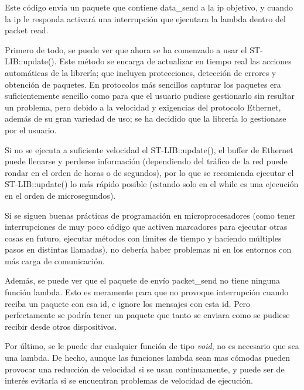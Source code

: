 \documentclass{report}
\begin{document}
Este código envía un paquete que contiene data\_send a la ip objetivo, y cuando la ip le responda activará una interrupción que ejecutara la lambda dentro del packet read. 
\par
Primero de todo, se puede ver que ahora se ha comenzado a usar el ST-LIB::update(). Este método se encarga de actualizar en tiempo real las acciones automáticas de la librería; que incluyen protecciones, detección de errores y obtención de paquetes. En protocolos más sencillos capturar los paquetes era suficientemente sencillo como para que el usuario pudiese gestionarlo sin resultar un problema, pero debido a la velocidad y exigencias del protocolo Ethernet, además de su gran variedad de uso; se ha decidido que la librería lo gestionase por el usuario. 
\par \vspace{0.3cm}
Si no se ejecuta a suficiente velocidad el ST-LIB::update(), el buffer de Ethernet puede llenarse y perderse información (dependiendo del tráfico de la red puede rondar en el orden de horas o de segundos), por lo que se recomienda ejecutar el ST-LIB::update() lo más rápido posible (estando solo en el while es una ejecución en el orden de microsegundos). 
\par
 Si se siguen buenas prácticas de programación en microprocesadores (como tener interrupciones de muy poco código que activen marcadores para ejecutar otras cosas en futuro, ejecutar métodos con límites de tiempo y haciendo múltiples pasos en distintas llamadas), no debería haber problemas ni en los entornos con más carga de comunicación. 
 \par \vspace{0.3cm}
 Además, se puede ver que el paquete de envío packet\_send no tiene ninguna función lambda. Esto es meramente para que no provoque interrupción cuando reciba un paquete con esa id, e ignore los mensajes con esta id. Pero perfectamente se podría tener un paquete que tanto se enviara como se pudiese recibir desde otros dispositivos. \par
 Por último, se le puede dar cualquier función de tipo \textit{void}, no es necesario que sea una lambda. De hecho, aunque las funciones lambda sean mas cómodas pueden provocar una reducción de velocidad si se usan continuamente, y puede ser de interés evitarla si se encuentran problemas de velocidad de ejecución. 
\end{document}
